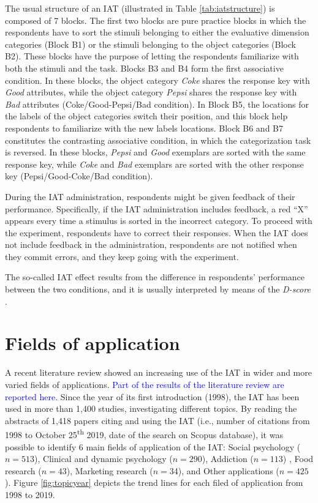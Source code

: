 \documentclass[12pt]{book}
\begin{document}
The usual structure of an IAT (illustrated in Table \ref{tab:iatstructure}) is composed of 7 blocks. The first two blocks are pure practice blocks in which the respondents have to sort the stimuli belonging to either the evaluative dimension categories (Block B1) or the stimuli belonging to the object categories (Block B2). These blocks have the purpose of letting the respondents familiarize with both the stimuli and the task. Blocks B3 and B4 form the first associative condition. In these blocks, the object category \emph{Coke} shares the response key with \emph{Good} attributes, while the object category \emph{Pepsi} shares the response key with \emph{Bad} attributes (Coke/Good-Pepsi/Bad condition). 
In Block B5, the locations for the labels of the object categories switch their position, and this block help respondents to familiarize with the new labels locations. 
Block B6 and B7 constitutes the contrasting associative condition, in which the categorization task is reversed. In these blocks, \emph{Pepsi} and \emph{Good} exemplars are sorted with the same response key, while \emph{Coke} and \emph{Bad} exemplars are sorted with the other response key (Pepsi/Good-Coke/Bad condition).  

During the IAT administration, respondents might be given feedback of their performance. Specifically, if the IAT administration includes feedback, a red ``X'' appears every time a stimulus is sorted in the incorrect category. To proceed with the experiment, respondents have to correct their responses. When the IAT does not include feedback in the administration, respondents are not notified when they commit errors, and they keep going with the experiment. 

The so-called IAT effect results from the difference in respondents' performance between the two conditions, and it is usually interpreted by means of the \emph{D-score} \cite[see Chapter \ref{sec:iatD}]{Greenwald2003}.


\section{Fields of application}

A recent literature review \cite{Epifania2020} showed an increasing use of the IAT in wider and more varied fields of applications. \textcolor{blue}{Part of the results of the literature review are reported here.}
Since the year of its first introduction (1998), the IAT has been used in more than 1,400 studies, investigating different topics. By reading the abstracts of 1,418 papers citing and using the IAT (i.e., number of citations from 1998 to October 25\textsuperscript{th} 2019, date of the search on Scopus database), it was possible to identify 6 main fields of application of the IAT: Social psychology ($n = 513$), Clinical and dynamic psychology ($n = 290$), Addiction ($n = 113$) , Food research ($n = 43$), Marketing research ($n = $34), and Other applications ($n = 425$). Figure \ref{fig:topicyear} depicts the trend lines for  each filed of application from 1998 to 2019. 
\end{document}
